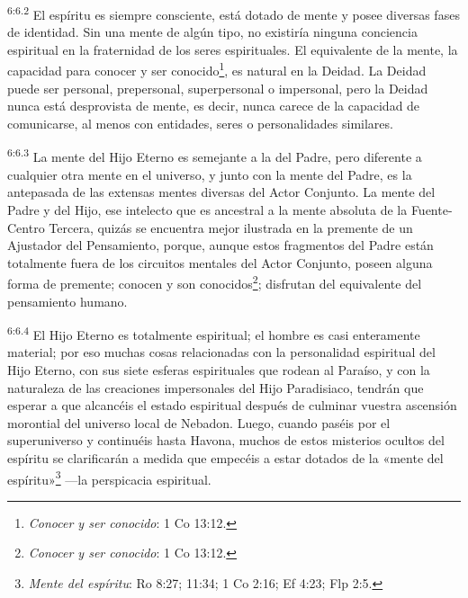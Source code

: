 \par
\textsuperscript{6:6.2} El espíritu es siempre consciente, está dotado de mente y posee diversas fases de identidad. Sin una mente de algún tipo, no existiría ninguna conciencia espiritual en la fraternidad de los seres espirituales. El equivalente de la mente, la capacidad para conocer y ser conocido\footnote{\textit{Conocer y ser conocido}: 1 Co 13:12.}, es natural en la Deidad. La Deidad puede ser personal, prepersonal, superpersonal o impersonal, pero la Deidad nunca está desprovista de mente, es decir, nunca carece de la capacidad de comunicarse, al menos con entidades, seres o personalidades similares.

\par
\textsuperscript{6:6.3} La mente del Hijo Eterno es semejante a la del Padre, pero diferente a cualquier otra mente en el universo, y junto con la mente del Padre, es la antepasada de las extensas mentes diversas del Actor Conjunto. La mente del Padre y del Hijo, ese intelecto que es ancestral a la mente absoluta de la Fuente-Centro Tercera, quizás se encuentra mejor ilustrada en la premente de un Ajustador del Pensamiento, porque, aunque estos fragmentos del Padre están totalmente fuera de los circuitos mentales del Actor Conjunto, poseen alguna forma de premente; conocen y son conocidos\footnote{\textit{Conocer y ser conocido}: 1 Co 13:12.}; disfrutan del equivalente del pensamiento humano.

\par
\textsuperscript{6:6.4} El Hijo Eterno es totalmente espiritual; el hombre es casi enteramente material; por eso muchas cosas relacionadas con la personalidad espiritual del Hijo Eterno, con sus siete esferas espirituales que rodean al Paraíso, y con la naturaleza de las creaciones impersonales del Hijo Paradisiaco, tendrán que esperar a que alcancéis el estado espiritual después de culminar vuestra ascensión morontial del universo local de Nebadon. Luego, cuando paséis por el superuniverso y continuéis hasta Havona, muchos de estos misterios ocultos del espíritu se clarificarán a medida que empecéis a estar dotados de la «mente del espíritu»\footnote{\textit{Mente del espíritu}: Ro 8:27; 11:34; 1 Co 2:16; Ef 4:23; Flp 2:5.} ---la perspicacia espiritual.

